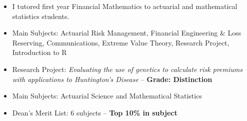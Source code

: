 \documentclass[10pt,a4paper]{altacv}
\begin{document}
\begin{itemize}
    \setlength{\itemindent}{0.5em}
  \item \small{I tutored first year Financial Mathematics to actuarial and mathematical statistics students.}
\end{itemize}



\begin{itemize}
    \setlength{\itemindent}{0.5em}
    \item   \small{Main Subjects: Actuarial Risk Management, Financial Engineering \& Loss Reserving, Communications, Extreme Value Theory, Research Project, Introduction to R}
    \item   \small{Research Project: \textit{Evaluating the use of genetics to calculate risk premiums with applications to Huntington's Disease} -- \textbf{Grade: Distinction}}
\end{itemize}

\medskip



\begin{itemize}
    \setlength{\itemindent}{0.5em}
    \item   \small{Main Subjects: Actuarial Science and Mathematical Statistics}
    \item \small{Dean's Merit List: 6 subjects -- \textbf{Top 10\% in subject}}
\end{itemize}
\medskip
{}
\end{document}
